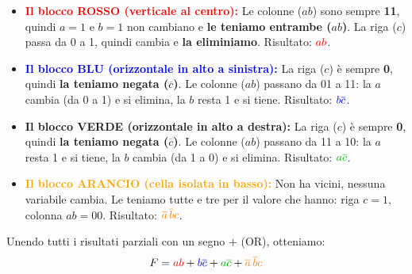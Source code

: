 \begin{itemize}
    \item \textcolor{red}{\textbf{Il blocco ROSSO (verticale al centro):}} Le colonne ($ab$) sono sempre \textbf{11}, quindi $a=1$ e $b=1$ non cambiano e \textbf{le teniamo entrambe ($ab$)}. La riga ($c$) passa da 0 a 1, quindi cambia e \textbf{la eliminiamo}. Risultato: $\textcolor{red}{ab}$.
    \item \textcolor{blue}{\textbf{Il blocco BLU (orizzontale in alto a sinistra):}} La riga ($c$) è sempre \textbf{0}, quindi \textbf{la teniamo negata ($\overline{c}$)}. Le colonne ($ab$) passano da 01 a 11: la $a$ cambia (da 0 a 1) e si elimina, la $b$ resta 1 e si tiene. Risultato: $\textcolor{blue}{b\overline{c}}$.
    \item \textcolor{green!70!black}{\textbf{Il blocco VERDE (orizzontale in alto a destra):}} La riga ($c$) è sempre \textbf{0}, quindi \textbf{la teniamo negata ($\overline{c}$)}. Le colonne ($ab$) passano da 11 a 10: la $a$ resta 1 e si tiene, la $b$ cambia (da 1 a 0) e si elimina. Risultato: $\textcolor{green!70!black}{a\overline{c}}$.
    \item \textcolor{orange}{\textbf{Il blocco ARANCIO (cella isolata in basso):}} Non ha vicini, nessuna variabile cambia. Le teniamo tutte e tre per il valore che hanno: riga $c=1$, colonna $ab=00$. Risultato: $\textcolor{orange}{\overline{a}\,\overline{b}c}$.
\end{itemize}

Unendo tutti i risultati parziali con un segno \textbf{$+$} (OR), otteniamo:
\[ F = \textcolor{red}{ab} + \textcolor{blue}{b\overline{c}} + \textcolor{green!70!black}{a\overline{c}} + \textcolor{orange}{\overline{a}\,\overline{b}c} \]

\vspace{1.5em}

